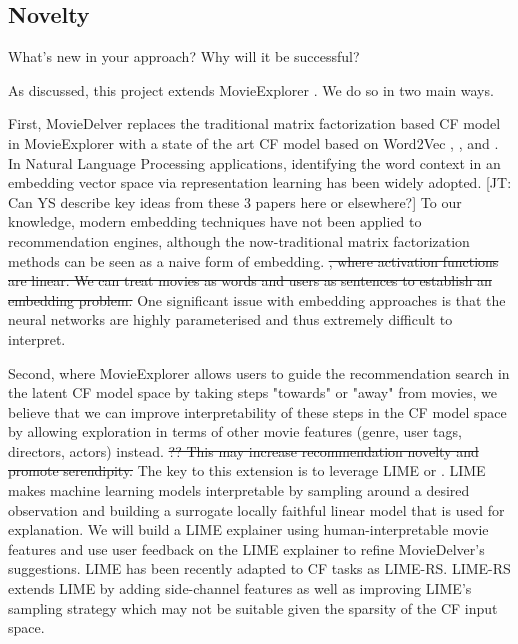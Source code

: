 \subsection{Novelty}
What's new in your approach? Why will it be successful?

As discussed, this project extends MovieExplorer \cite{taijala2018movieexplorer}. We do so in two main ways. 

First, MovieDelver replaces the traditional matrix factorization based CF model in MovieExplorer with a state of the art  CF model based on Word2Vec \cite{mikolov2013efficient}, \cite{rong2014word2vec}, and \cite{rong2014word2vec}. In Natural Language Processing applications, identifying the word context in an embedding vector space via representation learning has been widely adopted. [JT: Can YS describe key ideas from these 3 papers here or elsewhere?] To our knowledge, modern embedding techniques have not been applied to recommendation engines, although the now-traditional matrix factorization methods can be seen as a naive form of embedding. \st{, where activation functions are linear. We can treat movies as words and users as sentences to establish an embedding problem.} One significant issue with embedding approaches is that the neural networks are highly parameterised and thus extremely difficult to interpret.

Second, where MovieExplorer allows users to guide the recommendation search in the latent CF model space by taking steps "towards" or "away" from movies, we believe that we can improve interpretability of these steps in the CF model space by allowing exploration in terms of other movie features (genre, user tags, directors, actors) instead. \st{?? This may increase recommendation novelty and promote serendipity.} The key to this extension is to leverage LIME  \cite{ribeiro2016model} or  \cite{ribeiro2016should}. LIME makes machine learning models interpretable by sampling around a desired observation and building a surrogate locally faithful linear model that is used for explanation. We will build a LIME explainer using human-interpretable movie features and use user feedback on the LIME explainer to refine MovieDelver's suggestions. LIME has been recently adapted to CF tasks \cite{nobrega2019towards} as LIME-RS. LIME-RS extends LIME by adding side-channel features as well as improving LIME's sampling strategy which may not be suitable given the sparsity of the CF input space.

	